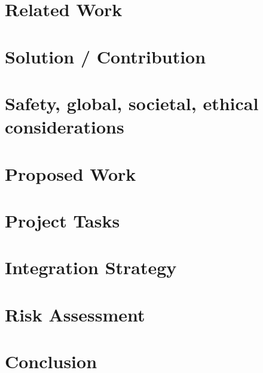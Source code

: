 \documentclass[11pt, journal]{IEEEtran}
\begin{document}
\section{Related Work}


\section{Solution / Contribution}


\section{Safety, global, societal, ethical considerations}


\section{Proposed Work}


\section{Project Tasks}


\section{Integration Strategy}


\section{Risk Assessment}


\section{Conclusion}


\appendices



\clearpage



%



\end{document}
